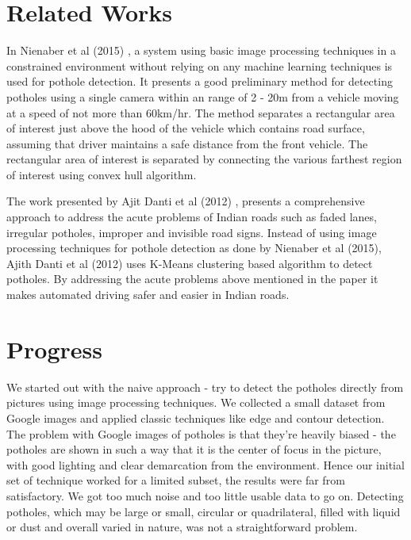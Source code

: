 \documentclass[12pt,a4paper]{article}
\begin{document}
\section{Related Works}
In Nienaber et al (2015) \cite{paperone}, a system using basic image processing techniques in a constrained environment without relying on any machine learning techniques is used for pothole detection. It presents a good preliminary method for detecting potholes using a single camera within an range of 2 - 20m from a vehicle moving at a speed of not more than 60km/hr. The method separates a rectangular area of interest just above the hood of the vehicle which contains road surface, assuming that driver maintains a safe distance from the front vehicle. The rectangular area of interest is separated by connecting the various farthest region of interest using convex hull algorithm.

\vspace*{.5cm}

The work presented by Ajit Danti et al (2012) \cite{papertwo}, presents a comprehensive approach to address the acute problems of Indian roads such as faded lanes, irregular potholes, improper and invisible road signs. Instead of using image processing techniques for pothole detection as done by Nienaber et al (2015), Ajith Danti et al (2012) uses K-Means clustering based algorithm to detect potholes. By addressing the acute problems above mentioned in the paper it makes automated driving safer and easier in Indian roads. 


\section{Progress}
We started out with the naive approach - try to detect the potholes directly from pictures using image processing techniques. We collected a small dataset from Google images and applied classic techniques like edge and contour detection. The problem with Google images of potholes is that they're heavily biased - the potholes are shown in such a way that it is the center of focus in the picture, with good lighting and clear demarcation from the environment. Hence our initial set of technique worked for a limited subset, the results were far from satisfactory. We got too much noise and too little usable data to go on. Detecting potholes, which may be large or small, circular or quadrilateral, filled with liquid or dust and overall varied in nature, was not a straightforward problem.

\vspace*{.5cm}
\end{document}
